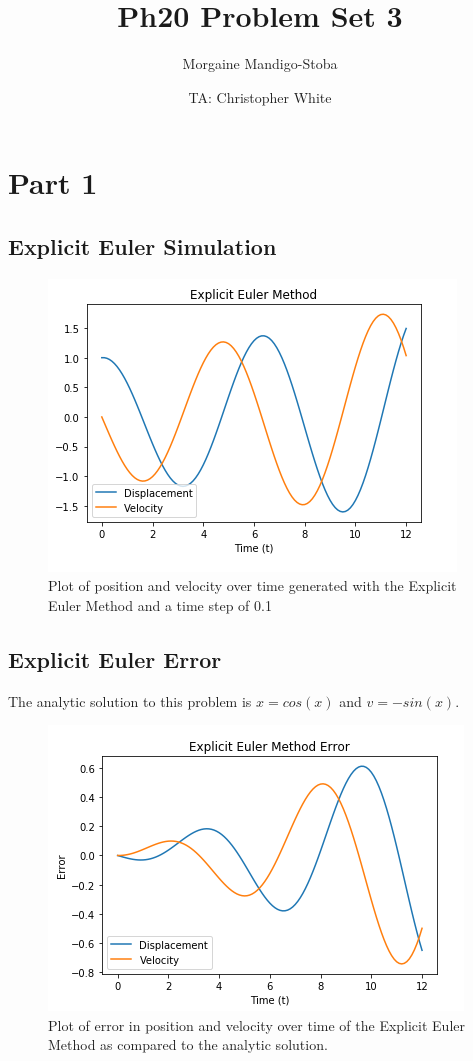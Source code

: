 \documentclass{article}
\title{Ph20 Problem Set 3}
\author{Morgaine Mandigo-Stoba}
\date{TA: Christopher White}
\begin{document}
\maketitle

\section{Part 1}

\subsection{Explicit Euler Simulation}

\begin{figure}[ht]
\centering
\includegraphics[scale=0.35]{exp_euler.png}
\caption{Plot of position and velocity over time generated with the Explicit Euler Method and a time step of 0.1}
\label{fig:expeuler}
\end{figure}

\subsection{Explicit Euler Error}

The analytic solution to this problem is $x=cos(x)$ and $v=-sin(x)$. 

\begin{figure}[ht]
\centering
\includegraphics[scale=0.35]{exp_euler_err.png}
\caption{Plot of error in position and velocity over time of the Explicit Euler Method as compared to the analytic solution.}
\label{fig:expeulererr}
\end{figure}
\end{document}
